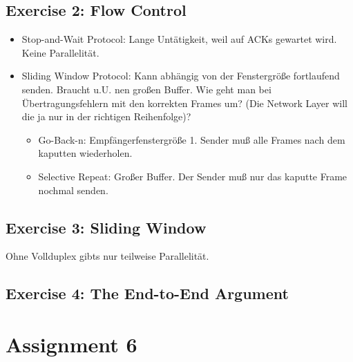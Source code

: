 \documentclass[10pt,a4paper]{scrartcl}
\begin{document}
\subsection*{Exercise 2: Flow Control}
\begin{itemize}
\item Stop-and-Wait Protocol: Lange Untätigkeit, weil auf ACKs gewartet wird. Keine Parallelität.
\item Sliding Window Protocol: Kann abhängig von der Fenstergröße fortlaufend senden. Braucht u.U. nen großen Buffer. Wie geht man bei Übertragungsfehlern mit den korrekten Frames um? (Die Network Layer will die ja nur in der richtigen Reihenfolge)?
\begin{itemize}
\item Go-Back-n: Empfängerfenstergröße 1. Sender muß alle Frames nach dem kaputten wiederholen.
\item Selective Repeat: Großer Buffer. Der Sender muß nur das kaputte Frame nochmal senden.
\end{itemize}
\end{itemize}

\subsection*{Exercise 3: Sliding Window}
Ohne Vollduplex gibts nur teilweise Parallelität.

\subsection*{Exercise 4: The End-to-End Argument}

\section*{Assignment 6}
\end{document}
